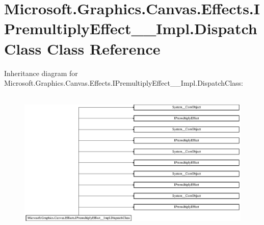 \hypertarget{class_microsoft_1_1_graphics_1_1_canvas_1_1_effects_1_1_i_premultiply_effect_____impl_1_1_dispatch_class}{}\section{Microsoft.\+Graphics.\+Canvas.\+Effects.\+I\+Premultiply\+Effect\+\_\+\+\_\+\+Impl.\+Dispatch\+Class Class Reference}
\label{class_microsoft_1_1_graphics_1_1_canvas_1_1_effects_1_1_i_premultiply_effect_____impl_1_1_dispatch_class}
Inheritance diagram for Microsoft.\+Graphics.\+Canvas.\+Effects.\+I\+Premultiply\+Effect\+\_\+\+\_\+\+Impl.\+Dispatch\+Class\+:\begin{figure}[H]
\begin{center}
\leavevmode
\includegraphics[height=7.000000cm]{class_microsoft_1_1_graphics_1_1_canvas_1_1_effects_1_1_i_premultiply_effect_____impl_1_1_dispatch_class}
\end{center}
\end{figure}
